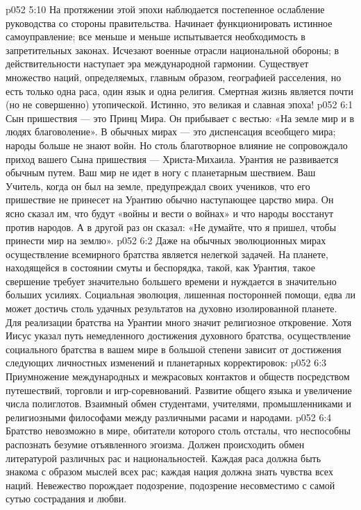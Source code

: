 \vs p052 5:10 На протяжении этой эпохи наблюдается постепенное ослабление руководства со стороны правительства. Начинает функционировать истинное самоуправление; все меньше и меньше испытывается необходимость в запретительных законах. Исчезают военные отрасли национальной обороны; в действительности наступает эра международной гармонии. Существует множество наций, определяемых, главным образом, географией расселения, но есть только одна раса, один язык и одна религия. Смертная жизнь является почти (но не совершенно) утопической. Истинно, это великая и славная эпоха!
\vs p052 6:1 Сын пришествия --- это Принц Мира. Он прибывает с вестью: «На земле мир и в людях благоволение». В обычных мирах --- это диспенсация всеобщего мира; народы больше не знают войн. Но столь благотворное влияние не сопровождало приход вашего Сына пришествия --- Христа\hyp{}Михаила. Урантия не развивается обычным путем. Ваш мир не идет в ногу с планетарным шествием. Ваш Учитель, когда он был на земле, предупреждал своих учеников, что его пришествие не принесет на Урантию обычно наступающее царство мира. Он ясно сказал им, что будут «войны и вести о войнах» и что народы восстанут против народов. А в другой раз он сказал: «Не думайте, что я пришел, чтобы принести мир на землю».
\vs p052 6:2 Даже на обычных эволюционных мирах осуществление всемирного братства является нелегкой задачей. На планете, находящейся в состоянии смуты и беспорядка, такой, как Урантия, такое свершение требует значительно большего времени и нуждается в значительно больших усилиях. Социальная эволюция, лишенная посторонней помощи, едва ли может достичь столь удачных результатов на духовно изолированной планете. Для реализации братства на Урантии много значит религиозное откровение. Хотя Иисус указал путь немедленного достижения духовного братства, осуществление социального братства в вашем мире в большой степени зависит от достижения следующих личностных изменений и планетарных корректировок:
\vs p052 6:3 \bibnobreakspace {} Приумножение международных и межрасовых контактов и обществ посредством путешествий, торговли и игр\hyp{}соревнований. Развитие общего языка и увеличение числа полиглотов. Взаимный обмен студентами, учителями, промышленниками и религиозными философами между различными расами и народами.
\vs p052 6:4 \bibnobreakspace {} Братство невозможно в мире, обитатели которого столь отсталы, что неспособны распознать безумие отъявленного эгоизма. Должен происходить обмен литературой различных рас и национальностей. Каждая раса должна быть знакома с образом мыслей всех рас; каждая нация должна знать чувства всех наций. Невежество порождает подозрение, подозрение несовместимо с самой сутью сострадания и любви.
